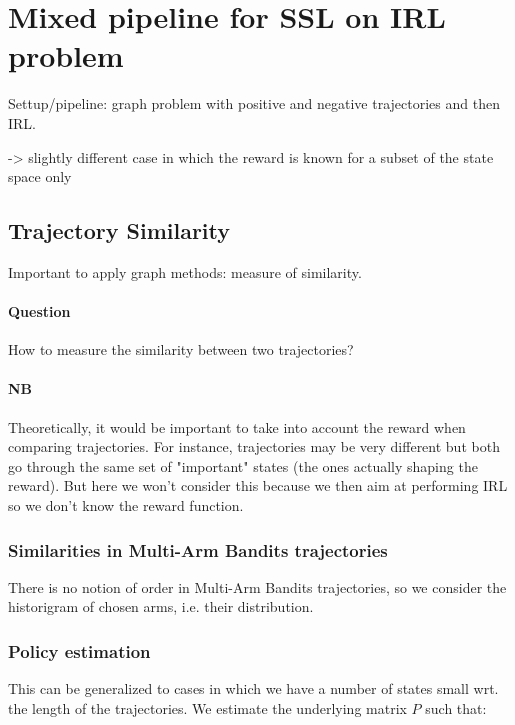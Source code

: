 \documentclass{article}
\begin{document}
\section{Mixed pipeline for SSL on IRL problem \label{sec:combine}}

Settup/pipeline: graph problem with positive and negative trajectories and then IRL.

\cite{Valko12}
\cite{Audiffren15}
\cite{Finn17} -> slightly different case in which the reward is known for a subset of the state space only


\subsection{Trajectory Similarity}

Important to apply graph methods: measure of similarity.

\paragraph{Question}
How to measure the similarity between two trajectories?

\paragraph{NB} Theoretically, it would be important to take into account the reward when comparing trajectories. For instance, trajectories may be very different but both go through the same set of "important" states (the ones actually shaping the reward). But here we won't consider this because we then aim at performing IRL so we don't know the reward function.

\subsubsection{Similarities in Multi-Arm Bandits trajectories}

There is no notion of order in Multi-Arm Bandits trajectories, so we consider the historigram of chosen arms, i.e. their distribution.

\subsubsection{Policy estimation}

This can be generalized to cases in which we have a number of states small wrt. the length of the trajectories. We estimate the underlying matrix $P$ such that:
\end{document}
